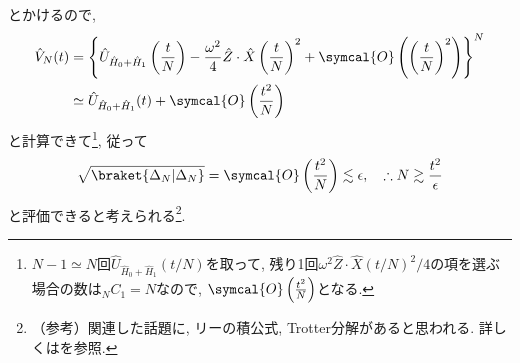 とかけるので, 
\begin{align*}
  \hat{V}_N(t)&=\left\{  \hat{U}_{\hat{H}_0+\hat{H}_1}\left(\frac{t}{N}\right)-\frac{\omega^2}{4}\hat{Z}\cdot\hat{X}\left( \frac{t}{N} \right)^2+\symcal{O}\left(  \left( \frac{t}{N} \right)^2\right)\right\}^N\\
  &\simeq\hat{U}_{\hat{H}_0+\hat{H}_1}(t)+\symcal{O}\left( \frac{t^2}{N} \right)
\end{align*}
と計算できて\footnote{$N-1\simeq N$回$\hat{U}_{\hat{H}_0+\hat{H}_1}(t/N)$を取って, 残り1回$\omega^2 \hat{Z}\cdot\hat{X}(t/N)^2/4$の項を選ぶ場合の数は${}_N C_1=N$なので, $\symcal{O}\left( \frac{t^2}{N} \right)$となる. }, 従って
\begin{equation}
  \sqrt{\braket{\Delta_N|\Delta_N}}=\symcal{O}\left( \frac{t^2}{N} \right)\lesssim \epsilon, \quad\therefore N\gtrsim \frac{t^2}{\epsilon}
\end{equation} 
と評価できると考えられる\footnote{（参考）関連した話題に, リーの積公式, Trotter分解があると思われる. 詳しくは\cite{naoto shiraishi}を参照. }. 








